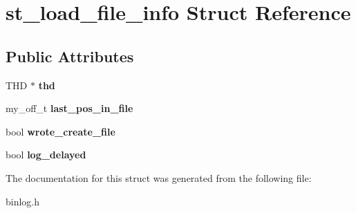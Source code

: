 \hypertarget{structst__load__file__info}{}\section{st\+\_\+load\+\_\+file\+\_\+info Struct Reference}
\label{structst__load__file__info}
\subsection*{Public Attributes}
\begin{DoxyCompactItemize}
\item 
\mbox{\label{structst__load__file__info_a396b16c82fbf5d7926bfeac6e245990f}} 
T\+HD $\ast$ {\bfseries thd}
\item 
\mbox{\label{structst__load__file__info_a6e81531abee62092dfd9658ab99fe929}} 
my\+\_\+off\+\_\+t {\bfseries last\+\_\+pos\+\_\+in\+\_\+file}
\item 
\mbox{\label{structst__load__file__info_a4c7bdb589376e429db985a6a2852bfa0}} 
bool {\bfseries wrote\+\_\+create\+\_\+file}
\item 
\mbox{\label{structst__load__file__info_a448cb4af4e07269c17480ab92c62b0f4}} 
bool {\bfseries log\+\_\+delayed}
\end{DoxyCompactItemize}


The documentation for this struct was generated from the following file\+:\begin{DoxyCompactItemize}
\item 
binlog.\+h\end{DoxyCompactItemize}
